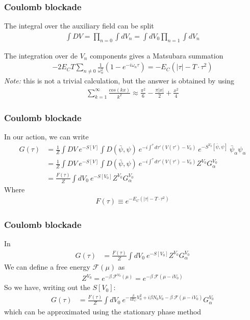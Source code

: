 \documentclass[]{beamer}
\begin{document}
\begin{frame}[t]\frametitle{Coulomb blockade}
  The integral over the auxiliary field can be split
  \begin{align*}
    \int DV = \prod_{n=0} \int dV_n = \int dV_0 \prod_{n=1} \int dV_n
  \end{align*}

  The integration over de $V_n$ components gives a Matsubara summation
  \begin{align*}
    -2 E_C T \sum_{n \not= 0} \frac{1}{\omega_n^2} (1 - e^{-i \omega_n \tau})
    = - E_C (|\tau| - T \cdot \tau^2)
  \end{align*}
  \emph{Note:} this is not a trivial calculation, but the answer is obtained by using
  \begin{align*}
    \sum_{k=1}^{\infty} \frac{cos(k x)}{k^2} \approx \frac{\pi^2}{6} - \frac{\pi |x|}{2} + \frac{x^2}{4}
  \end{align*}
\end{frame}

\begin{frame}[t]\frametitle{Coulomb blockade}
  In our action, we can write
  \begin{align*}
    G(\tau) &= \frac{1}{Z} \int DV ~ e^{-S[V]} \int D(\bar{\psi}, \psi) ~ e^{-i \int^{\tau} d\tau' (V(\tau') - V_0)} ~ e^{-S^{V_0}[\bar{\psi}, \psi]} ~ \bar{\psi}_{\alpha} \psi_{\alpha}\\
    &= \frac{1}{Z} \int DV ~ e^{-S[V]} \int D(\bar{\psi}, \psi) ~ e^{-i \int^{\tau} d\tau' (V(\tau') - V_0)} Z^{V_0} G_{\alpha}^{V_0}\\
    &= \frac{F(\tau)}{Z} \int dV_0 ~ e^{-S[V_0]} Z^{V_0} G_{\alpha}^{V_0}
  \end{align*}
  Where
  \begin{align*}
    F(\tau) \equiv e^{- E_C (|\tau| - T \cdot \tau^2)}
  \end{align*}
\end{frame}

\begin{frame}[t]\frametitle{Coulomb blockade}
  In
  \begin{align*}
    G(\tau) &= \frac{F(\tau)}{Z} \int dV_0 ~ e^{-S[V_0]} Z^{V_0} G_{\alpha}^{V_0}
  \end{align*}
  We can define a free energy $\mathcal{F}(\mu)$ as
  \begin{align*}
    Z^{V_0} = e^{-\beta ~ \mathcal{F}^{V_0}(\mu)} = e^{-\beta ~ \mathcal{F}(\mu - i V_0)}
  \end{align*}
  So we have, writing out the $S[V_0]$:
  \begin{align*}
    G(\tau) &= \frac{F(\tau)}{Z} \int dV_0 ~ e^{-\frac{\beta}{4 E_C} V_0^2 + i \beta N_0 V_0 - \beta ~ \mathcal{F}(\mu - i V_0)} G_{\alpha}^{V_0}
  \end{align*}
  which can be approximated using the stationary phase method
\end{frame}
\end{document}

